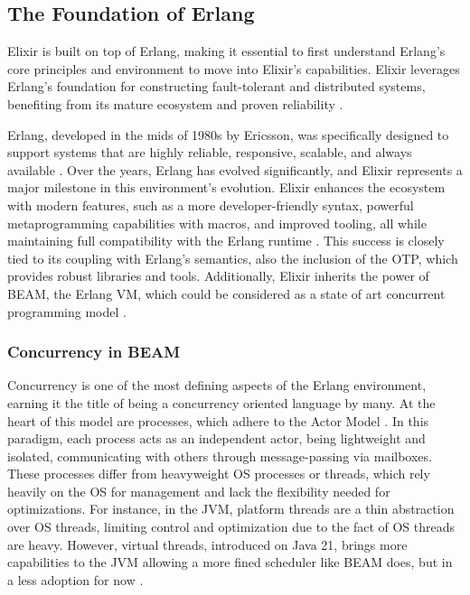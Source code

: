 \subsection{The Foundation of Erlang}

Elixir is built on top of Erlang, making it essential to first understand Erlang’s core principles and environment to move into Elixir’s capabilities. Elixir leverages Erlang’s foundation for constructing fault-tolerant and distributed systems, benefiting from its mature ecosystem and proven reliability \cite{Juric2024,Armstrong2013}.

Erlang, developed in the mids of 1980s by Ericsson, was specifically designed to support systems that are highly reliable, responsive, scalable, and always available \cite{Armstrong2013,Juric2024}. Over the years, Erlang has evolved significantly, and Elixir represents a major milestone in this environment's evolution. Elixir enhances the ecosystem with modern features, such as a more developer-friendly syntax, powerful metaprogramming capabilities with macros, and improved tooling, all while maintaining full compatibility with the Erlang runtime \cite{Juric2024}. This success is closely tied to its coupling with Erlang’s semantics, also the inclusion of the \gls{OTP}, which provides robust libraries and tools. Additionally, Elixir inherits the power of \gls{BEAM}, the Erlang \gls{VM}, which could be considered as a state of art concurrent programming model \cite{erlang-concurrency-blog}.

\subsubsection{Concurrency in BEAM}

Concurrency is one of the most defining aspects of the Erlang environment, earning it the title of being a concurrency oriented language by many. At the heart of this model are processes, which adhere to the Actor Model \cite{Juric2024,Valkov2018}. In this paradigm, each process acts as an independent actor, being lightweight and isolated, communicating with others through message-passing via mailboxes. These processes differ from heavyweight \gls{OS} processes or threads, which rely heavily on the \gls{OS} for management and lack the flexibility needed for optimizations. For instance, in the \gls{JVM}, platform threads are a thin abstraction over \gls{OS} threads, limiting control and optimization due to the fact of \gls{OS} threads are heavy. However, virtual threads, introduced on Java 21, brings more capabilities to the \gls{JVM} allowing a more fined scheduler like BEAM does, but in a less adoption for now \cite{erlang-concurrency-blog}.

